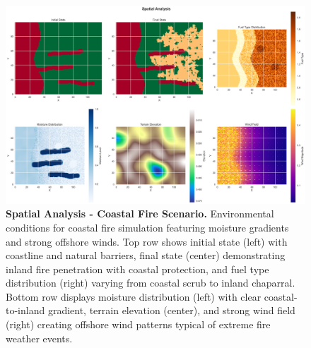 \begin{figure}[H]
	\centering
	\includegraphics[width=\textwidth]{media/spatial_analysis_coast.png}
	\caption{
		\textbf{Spatial Analysis - Coastal Fire Scenario.}
		Environmental conditions for coastal fire simulation featuring moisture gradients and strong offshore winds. Top row shows initial state (left) with coastline and natural barriers, final state (center) demonstrating inland fire penetration with coastal protection, and fuel type distribution (right) varying from coastal scrub to inland chaparral. Bottom row displays moisture distribution (left) with clear coastal-to-inland gradient, terrain elevation (center), and strong wind field (right) creating offshore wind patterns typical of extreme fire weather events.
	}
	\label{fig:spatial_coast}
\end{figure}
